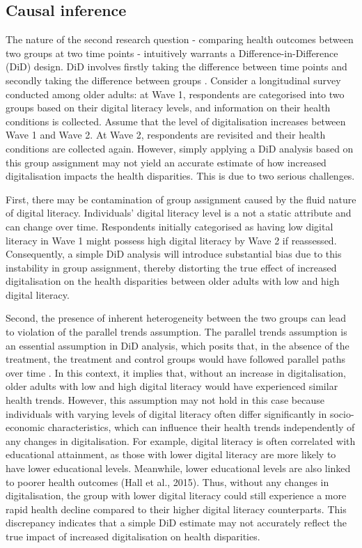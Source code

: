 \subsection{Causal inference}
The nature of the second research question - comparing health outcomes between two groups at two time points - intuitively warrants a Difference-in-Difference (DiD) design. DiD involves firstly taking the difference between time points and secondly taking the difference between groups \parencite[p. 229]{angrist_mostly_2009}. Consider a longitudinal survey conducted among older adults: at Wave 1, respondents are categorised into two groups based on their digital literacy levels, and information on their health conditions is collected. Assume that the level of digitalisation increases between Wave 1 and Wave 2. At Wave 2, respondents are revisited and their health conditions are collected again. However, simply applying a DiD analysis based on this group assignment may not yield an accurate estimate of how increased digitalisation impacts the health disparities. This is due to two serious challenges.

First, there may be contamination of group assignment caused by the fluid nature of digital literacy. Individuals' digital literacy level is a not a static attribute and can change over time\parencite{chetty_bridging_2018}. Respondents initially categorised as having low digital literacy in Wave 1 might possess high digital literacy by Wave 2 if reassessed. Consequently, a simple DiD analysis will introduce substantial bias due to this instability in group assignment, thereby distorting the true effect of increased digitalisation on the health disparities between older adults with low and high digital literacy.

Second, the presence of inherent heterogeneity between the two groups can lead to violation of the parallel trends assumption. The parallel trends assumption is an essential assumption in DiD analysis, which posits that, in the absence of the treatment, the treatment and control groups would have followed parallel paths over time \parencite[p. 230]{angrist_mostly_2009}. In this context, it implies that, without an increase in digitalisation, older adults with low and high digital literacy would have experienced similar health trends. However, this assumption may not hold in this case because individuals with varying levels of digital literacy often differ significantly in socio-economic characteristics, which can influence their health trends independently of any changes in digitalisation. For example, digital literacy is often correlated with educational attainment, as those with lower digital literacy are more likely to have lower educational levels. Meanwhile, lower educational levels are also linked to poorer health outcomes (Hall et al., 2015). Thus, without any changes in digitalisation, the group with lower digital literacy could still experience a more rapid health decline compared to their higher digital literacy counterparts. This discrepancy indicates that a simple DiD estimate may not accurately reflect the true impact of increased digitalisation on health disparities. 
